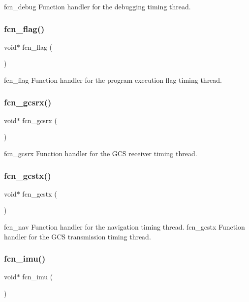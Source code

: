 fcn\+\_\+debug Function handler for the debugging timing thread. \mbox{\label{timer_8c_a1de21361a80b4a8cc73ac302a159ac8b}} 
\subsubsection{fcn\+\_\+flag()}
{\footnotesize\ttfamily void$\ast$ fcn\+\_\+flag (\begin{DoxyParamCaption}{ }\end{DoxyParamCaption})}

fcn\+\_\+flag Function handler for the program execution flag timing thread. \mbox{\label{timer_8c_a2e92663e16d4e92eb336c377906b8b2d}} 
\subsubsection{fcn\+\_\+gcsrx()}
{\footnotesize\ttfamily void$\ast$ fcn\+\_\+gcsrx (\begin{DoxyParamCaption}{ }\end{DoxyParamCaption})}

fcn\+\_\+gcsrx Function handler for the G\+CS receiver timing thread. \mbox{\label{timer_8c_a11ad44a945d1b874c1c0abe895a86eea}} 
\subsubsection{fcn\+\_\+gcstx()}
{\footnotesize\ttfamily void$\ast$ fcn\+\_\+gcstx (\begin{DoxyParamCaption}{ }\end{DoxyParamCaption})}

fcn\+\_\+nav Function handler for the navigation timing thread. fcn\+\_\+gcstx Function handler for the G\+CS transmission timing thread. \mbox{\label{timer_8c_a428bfc3b3423ed672ccc7ff5f3a9349f}} 
\subsubsection{fcn\+\_\+imu()}
{\footnotesize\ttfamily void$\ast$ fcn\+\_\+imu (\begin{DoxyParamCaption}{ }\end{DoxyParamCaption})}

